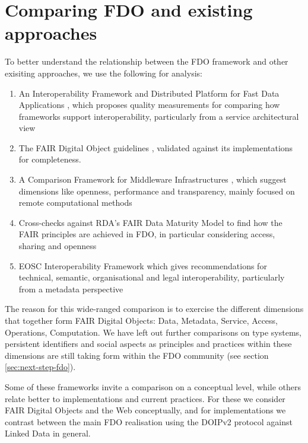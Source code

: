 \documentclass[fleqn,10pt,lineno]{wlpeerjlua}
\providecommand{\tightlist}{%
  \setlength{\itemsep}{0pt}\setlength{\parskip}{0pt}}
\begin{document}
\hypertarget{sec:comparing}{%
\section*{Comparing FDO and existing approaches}\label{sec:comparing}}

To better understand the relationship between the FDO framework and other exisiting approaches, we use the following for analysis:

\begin{enumerate}
\def\labelenumi{\arabic{enumi}.}
\tightlist
\item
  An Interoperability Framework and Distributed Platform for Fast Data Applications \autocite{delgadoInteroperabilityFrameworkDistributed2016a}, which proposes quality measurements for comparing how frameworks support interoperability, particularly from a service architectural view
\item
  The FAIR Digital Object guidelines \autocite{boninoFAIRDigitalObject}, validated against its implementations for completeness.
\item
  A Comparison Framework for Middleware Infrastructures \autocite{zarrasComparisonFrameworkMiddleware2004a}, which suggest dimensions like openness, performance and transparency, mainly focused on remote computational methods
\item
  Cross-checks against RDA's FAIR Data Maturity Model \autocite{bahimFAIRDataMaturity2020a} to find how the FAIR principles are achieved in FDO, in particular considering access, sharing and openness
\item
  EOSC Interoperability Framework \autocite{corchoEOSCInteroperabilityFramework2021b} which gives recommendations for technical, semantic, organisational and legal interoperability, particularly from a metadata perspective
\end{enumerate}

The reason for this wide-ranged comparison is to exercise the different dimensions that together form FAIR Digital Objects: Data, Metadata, Service, Access, Operations, Computation.
We have left out further comparisons on type systems, persistent identifiers and social aspects as principles and practices within these dimensions are still taking form within the FDO community (see section \ref{sec:next-step-fdo}).

Some of these frameworks invite a comparison on a conceptual level, while others relate better to implementations and current practices. For these we consider FAIR Digital Objects and the Web conceptually, and for implementations we contrast between the main FDO realisation using the DOIPv2 protocol \autocite{foundationDigitalObjectInterface} against Linked Data in general.
\end{document}
